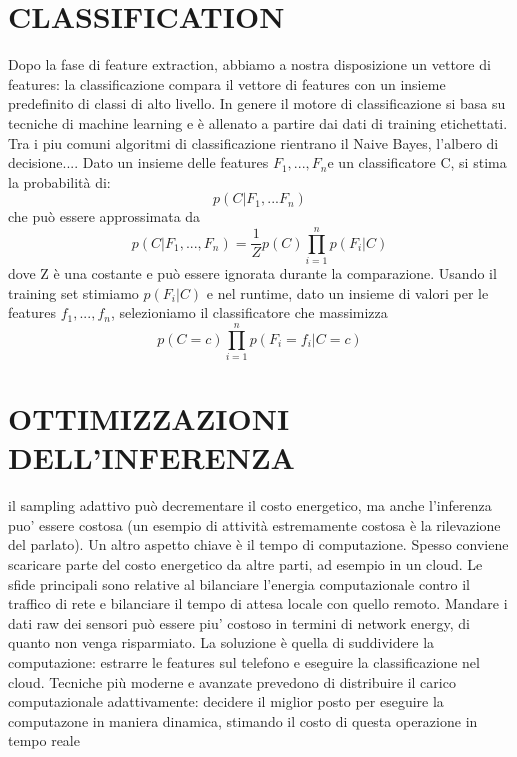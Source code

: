 \documentclass{article}
\begin{document}
\section{CLASSIFICATION}
Dopo la fase di feature extraction, abbiamo a nostra disposizione un vettore di features: la classificazione compara il vettore di features con un insieme predefinito di classi di alto livello. In genere il motore di classificazione si basa su tecniche di machine learning e è allenato a partire dai dati di training etichettati. Tra i piu comuni algoritmi di classificazione rientrano il Naive Bayes, l'albero di decisione....
\bigbreak
Dato un insieme delle features $F_1, ..., F_n$e un classificatore C, si stima la probabilità di:
\begin{equation}
p(C|F_1, ...F_n)
\end{equation}
che può essere approssimata da 
\begin{equation}
p(C|F_1,...,F_n)=\frac{1}{Z}p(C)\prod_{i=1}^{n}p(F_i|C)
\end{equation}
dove Z è una costante e può essere ignorata durante la comparazione. Usando il training set stimiamo $p(F_i|C)$ e nel runtime, dato un insieme di valori per le features $f_1, ..., f_n$, selezioniamo il classificatore che massimizza
\begin{equation}
p(C=c)\prod_{i=1}^{n}p(F_i=f_i|C=c)
\end{equation}

\section{OTTIMIZZAZIONI DELL'INFERENZA}
il sampling adattivo può decrementare il costo energetico, ma anche l'inferenza puo' essere costosa (un esempio di attività estremamente costosa è la rilevazione del parlato). Un altro aspetto chiave è il tempo di computazione. Spesso conviene scaricare parte del costo energetico da altre parti, ad esempio in un cloud. 
Le sfide principali sono relative al bilanciare l'energia computazionale contro il traffico di rete e bilanciare il tempo di attesa locale con quello remoto. 
Mandare i dati raw dei sensori può essere piu' costoso in termini di network energy, di quanto non venga risparmiato. La soluzione è quella di suddividere la computazione: estrarre le features sul telefono e eseguire la classificazione nel cloud. Tecniche più moderne e avanzate prevedono di distribuire il carico computazionale adattivamente: decidere il miglior posto per eseguire la computazone in maniera dinamica, stimando il costo di questa operazione in tempo reale
\end{document}
